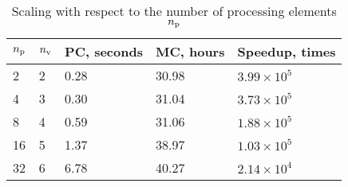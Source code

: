 \begin{table}[h]
  \vspace{-0.5em}
  \centering
  \caption{Scaling with respect to the number of processing elements \textnormal{${n_\text{p}}$}}
  \vspace{-0.5em}
  \begin{tabular*}{1\linewidth}{L{20pt}L{15pt}R{50pt}R{50pt}R{60pt}}
    \toprule
    ${n_\text{p}}$ & ${n_\text{v}}$ & PC, seconds & MC, hours & Speedup, times \\
    \midrule
     & 2 & 0.28 & 30.98 & $3.99 \times 10^5$ \\
     4 & 3 & 0.30 & 31.04 & $3.73 \times 10^5$ \\
     8 & 4 & 0.59 & 31.06 & $1.88 \times 10^5$ \\
    16 & 5 & 1.37 & 38.97 & $1.03 \times 10^5$ \\
    32 & 6 & 6.78 & 40.27 & $2.14 \times 10^4$ \\
    \bottomrule
  \end{tabular*}
  \vspace{-0.5em}
\end{table}
